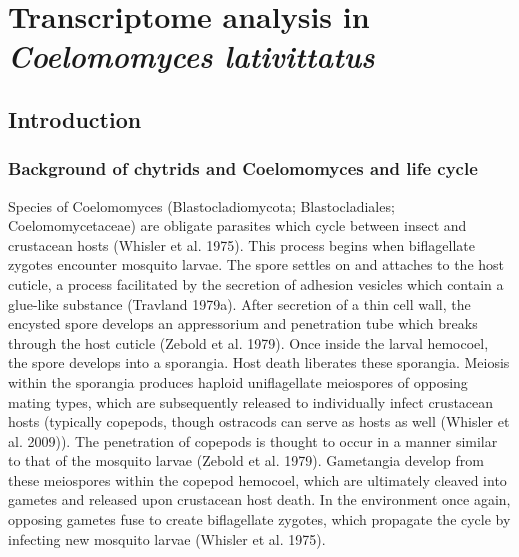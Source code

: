 ﻿%
\chapter{Transcriptome analysis in \textit{Coelomomyces lativittatus}}
\label{chap:Clat_transcriptome}
\section{Introduction}
\subsection{Background of chytrids and Coelomomyces and life cycle}
Species of Coelomomyces (Blastocladiomycota; Blastocladiales; Coelomomycetaceae) are obligate parasites which cycle between insect and crustacean hosts (Whisler et al. 1975). This process begins when biflagellate zygotes encounter mosquito larvae. The spore settles on and attaches to the host cuticle, a process facilitated by the secretion of adhesion vesicles which contain a glue-like substance (Travland 1979a). After secretion of a thin cell wall, the encysted spore develops an appressorium and penetration tube which breaks through the host cuticle (Zebold et al. 1979). Once inside the larval hemocoel, the spore develops into a sporangia. Host death liberates these sporangia. Meiosis within the sporangia produces haploid uniflagellate meiospores of opposing mating types, which are subsequently released to individually infect crustacean hosts (typically copepods, though ostracods can serve as hosts as well (Whisler et al. 2009)). The penetration of copepods is thought to occur in a manner similar to that of the mosquito larvae (Zebold et al. 1979). Gametangia develop from these meiospores within the copepod hemocoel, which are ultimately cleaved into gametes and released upon crustacean host death. In the environment once again, opposing gametes fuse to create biflagellate zygotes, which propagate the cycle by infecting new mosquito larvae (Whisler et al. 1975).\\
